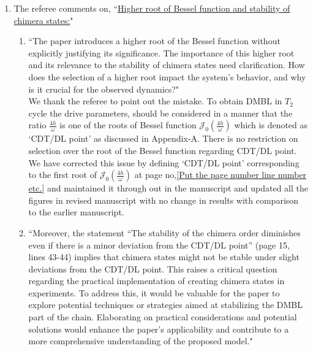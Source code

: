 \documentclass[aps,prb,reprint,showpacs,floatfix,superscriptaddress, onecolumn, nofootinbib, 10pt]{revtex4-2}
\newcommand{\response}[1]{{\color{black}#1}} %
\newcommand{\comment}[1]{{\color{blue}#1}} %
\begin{document}
\begin{enumerate}
\begin{enumerate}
{		}
		\item The referee comments on, \comment{``\underline{Higher root of Bessel function and stability of chimera states:}"}\\
		\begin{enumerate}
			\item \comment{``The paper introduces a higher root of the Bessel function without explicitly justifying its significance. The importance of this higher root and its relevance to the stability
				of chimera states need clarification. How does the selection of a higher root impact the system's behavior, and why is it crucial for the observed dynamics?"}\\
			
			\response{We thank the referee to point out the mistake. To obtain DMBL in $T_2$ cycle the drive parameters, should be considered in a manner that the ratio $\frac{4h}{\omega}$ is one of the roots of Bessel function $\mathcal{J}_0\left(\frac{4h}{\omega}\right)$ which is denoted as `CDT/DL point' as discussed in Appendix-A. There is no restriction on selection over the root of the Bessel function regarding CDT/DL point. We have corrected this issue by defining `CDT/DL point' corresponding to the first root of $\mathcal{J}_0\left(\frac{4h}{\omega}\right)$ at page no,\ref{Put the page number line number etc.} and maintained it through out in the manuscript and updated all the figures in revised manuscript with no change in results with comparison to the earlier manuscript. 
			}\\
			\item \comment{``Moreover, the statement “The stability of the chimera order diminishes even if there is a minor deviation from the CDT/DL point” (page 15, lines 43-44) implies that chimera states might not be stable under slight deviations from the CDT/DL point. This raises a critical question regarding the practical implementation of creating chimera states in experiments. To address this, it would be valuable for the paper to explore potential techniques or strategies aimed at stabilizing the DMBL part of the chain. Elaborating on practical considerations and potential solutions would enhance the paper's applicability and contribute to a more comprehensive understanding of the proposed model."}\\
			

\end{enumerate}
\end{enumerate}
\end{enumerate}
\end{document}
